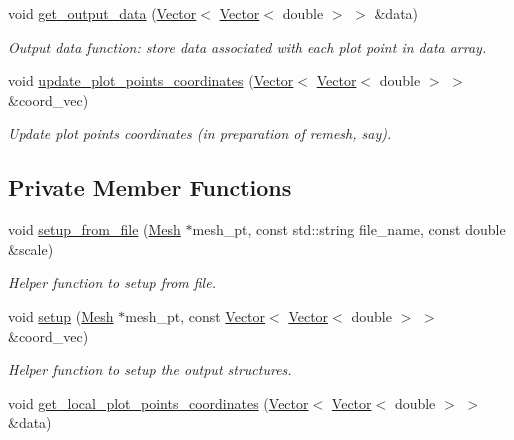 \begin{DoxyCompactItemize}
void \hyperlink{classoomph_1_1LineVisualiser_af2fadf8f1270a15a912cadfea152891e}{get\+\_\+output\+\_\+data} (\hyperlink{classoomph_1_1Vector}{Vector}$<$ \hyperlink{classoomph_1_1Vector}{Vector}$<$ double $>$ $>$ \&data)
\begin{DoxyCompactList}\small\item\em Output data function\+: store data associated with each plot point in data array. \end{DoxyCompactList}\item 
void \hyperlink{classoomph_1_1LineVisualiser_a88beccc9e1770c7acb14a7e088999ab0}{update\+\_\+plot\+\_\+points\+\_\+coordinates} (\hyperlink{classoomph_1_1Vector}{Vector}$<$ \hyperlink{classoomph_1_1Vector}{Vector}$<$ double $>$ $>$ \&coord\+\_\+vec)
\begin{DoxyCompactList}\small\item\em Update plot points coordinates (in preparation of remesh, say). \end{DoxyCompactList}\end{DoxyCompactItemize}
\subsection*{Private Member Functions}
\begin{DoxyCompactItemize}
\item 
void \hyperlink{classoomph_1_1LineVisualiser_adfa22f79f20d300d045f2ef730f466ce}{setup\+\_\+from\+\_\+file} (\hyperlink{classoomph_1_1Mesh}{Mesh} $\ast$mesh\+\_\+pt, const std\+::string file\+\_\+name, const double \&scale)
\begin{DoxyCompactList}\small\item\em Helper function to setup from file. \end{DoxyCompactList}\item 
void \hyperlink{classoomph_1_1LineVisualiser_a8989cffc2b0ed7c32d9bd8a02c170de4}{setup} (\hyperlink{classoomph_1_1Mesh}{Mesh} $\ast$mesh\+\_\+pt, const \hyperlink{classoomph_1_1Vector}{Vector}$<$ \hyperlink{classoomph_1_1Vector}{Vector}$<$ double $>$ $>$ \&coord\+\_\+vec)
\begin{DoxyCompactList}\small\item\em Helper function to setup the output structures. \end{DoxyCompactList}\item 
void \hyperlink{classoomph_1_1LineVisualiser_aa1aad15408d65e8ee48dbff02fc97928}{get\+\_\+local\+\_\+plot\+\_\+points\+\_\+coordinates} (\hyperlink{classoomph_1_1Vector}{Vector}$<$ \hyperlink{classoomph_1_1Vector}{Vector}$<$ double $>$ $>$ \&data)
\end{DoxyCompactItemize}
